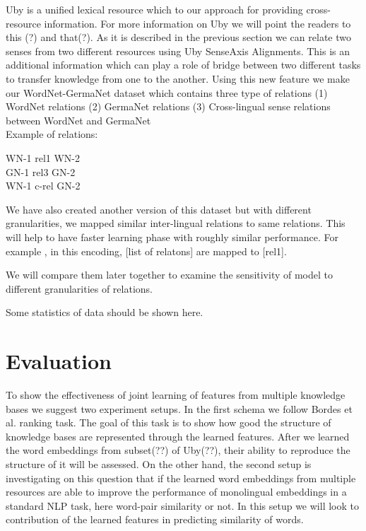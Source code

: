 \documentclass[11pt]{article}
\begin{document}
 Uby is a unified lexical resource which 
 to our approach for providing cross-resource information. For more information on Uby we will point the readers 
 to this (?) and that(?).
As it is described in the previous section we can relate two senses from two different resources using Uby SenseAxis Alignments.
This is an additional information which can play a role of bridge between two
different tasks to transfer knowledge from one to the another.
Using this new feature we make our WordNet-GermaNet dataset which contains three type of relations 
(1) WordNet relations 
(2) GermaNet relations
(3) Cross-lingual sense relations between WordNet and GermaNet
\\
Example of relations:
\begin{center}
WN-1 \hspace{0.5in}  rel1 \hspace{0.5in}   WN-2\\
GN-1 \hspace{0.5in} rel3 \hspace{0.5in}  GN-2\\
WN-1 \hspace{0.5in} c-rel \hspace{0.5in} GN-2\\
\end{center}

We have also created another version of this dataset but with different granularities, we mapped similar inter-lingual relations to same relations.
This will help to have faster learning phase with roughly similar performance.
For example , in this encoding, [list of relatons] are mapped to [rel1].

We will compare them later together to examine the sensitivity of model to
different granularities of relations. 

Some statistics of data should be shown here.





\section{Evaluation}
\label{sec:eval}

To show the effectiveness of joint learning of features from multiple knowledge bases we suggest 
two experiment setups. In the first schema we follow Bordes et al. ranking task. The goal of this task is
to show how good the structure of knowledge bases are represented through the learned features. 
After we learned the word embeddings from subset(??) of Uby(??),
their ability to reproduce the structure of it will be assessed. On the other hand, the second
setup is investigating on this question that if the learned word embeddings from multiple resources
are able to improve the performance of monolingual embeddings in a standard NLP
task, here word-pair similarity or not.
In this setup we will look to contribution of the learned features in predicting similarity of words.
\end{document}
